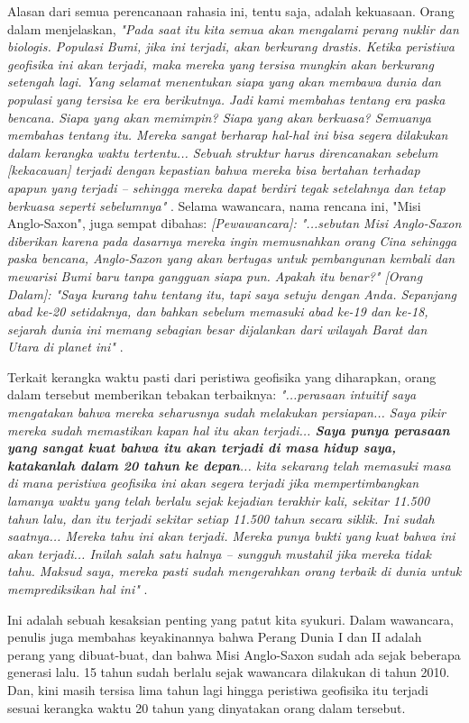 \documentclass[10pt,twocolumn,letterpaper]{article}
\begin{document}
Alasan dari semua perencanaan rahasia ini, tentu saja, adalah kekuasaan. Orang dalam menjelaskan, \textit{"Pada saat itu kita semua akan mengalami perang nuklir dan biologis. Populasi Bumi, jika ini terjadi, akan berkurang drastis. Ketika peristiwa geofisika ini akan terjadi, maka mereka yang tersisa mungkin akan berkurang setengah lagi. Yang selamat menentukan siapa yang akan membawa dunia dan populasi yang tersisa ke era berikutnya. Jadi kami membahas tentang era paska bencana. Siapa yang akan memimpin? Siapa yang akan berkuasa? Semuanya membahas tentang itu. Mereka sangat berharap hal-hal ini bisa segera dilakukan dalam kerangka waktu tertentu... Sebuah struktur harus direncanakan sebelum [kekacauan] terjadi dengan kepastian bahwa mereka bisa bertahan terhadap apapun yang terjadi -- sehingga mereka dapat berdiri tegak setelahnya dan tetap berkuasa seperti sebelumnya"} \cite{4}. Selama wawancara, nama rencana ini, "Misi Anglo-Saxon", juga sempat dibahas: \textit{[Pewawancara]: "...sebutan Misi Anglo-Saxon diberikan karena pada dasarnya mereka ingin memusnahkan orang Cina sehingga paska bencana, Anglo-Saxon yang akan bertugas untuk pembangunan kembali dan mewarisi Bumi baru tanpa gangguan siapa pun. Apakah itu benar?" [Orang Dalam]: "Saya kurang tahu tentang itu, tapi saya setuju dengan Anda. Sepanjang abad ke-20 setidaknya, dan bahkan sebelum memasuki abad ke-19 dan ke-18, sejarah dunia ini memang sebagian besar dijalankan dari wilayah Barat dan Utara di planet ini"} \cite{4}.

Terkait kerangka waktu pasti dari peristiwa geofisika yang diharapkan, orang dalam tersebut memberikan tebakan terbaiknya: \textit{"...perasaan intuitif saya mengatakan bahwa mereka seharusnya sudah melakukan persiapan... Saya pikir mereka sudah memastikan kapan hal itu akan terjadi... \textbf{Saya punya perasaan yang sangat kuat bahwa itu akan terjadi di masa hidup saya, katakanlah dalam 20 tahun ke depan}... kita sekarang telah memasuki masa di mana peristiwa geofisika ini akan segera terjadi jika mempertimbangkan lamanya waktu yang telah berlalu sejak kejadian terakhir kali, sekitar 11.500 tahun lalu, dan itu terjadi sekitar setiap 11.500 tahun secara siklik. Ini sudah saatnya... Mereka tahu ini akan terjadi. Mereka punya bukti yang kuat bahwa ini akan terjadi... Inilah salah satu halnya -- sungguh mustahil jika mereka tidak tahu. Maksud saya, mereka pasti sudah mengerahkan orang terbaik di dunia untuk memprediksikan hal ini"} \cite{4}.

Ini adalah sebuah kesaksian penting yang patut kita syukuri. Dalam wawancara, penulis juga membahas keyakinannya bahwa Perang Dunia I dan II adalah perang yang dibuat-buat, dan bahwa Misi Anglo-Saxon sudah ada sejak beberapa generasi lalu. 15 tahun sudah berlalu sejak wawancara dilakukan di tahun 2010. Dan, kini masih tersisa lima tahun lagi hingga peristiwa geofisika itu terjadi sesuai kerangka waktu 20 tahun yang dinyatakan orang dalam tersebut.
\end{document}
